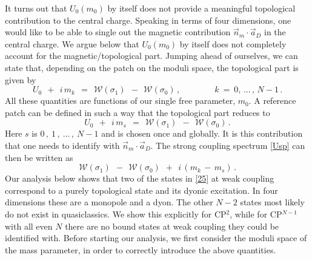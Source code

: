 \documentclass[epsfig,12pt]{article}
\def\beq{\begin{equation}}
\def\eeq{\end{equation}}
\def\beq{\begin{equation}}
\def\eeq{\end{equation}}
\newcommand{\mc}[1]{\mathcal{#1}}
\begin{document}
	It turns out that $ U_0(m_0) $ by itself does not  provide a meaningful topological contribution
	to the central charge.
	Speaking in terms of four dimensions, one would like to be able to single out 
	the magnetic contribution $ \vec{n}{}_m \cdot \vec{a}{}_D $ in the central charge.
	We argue below  that $ U_0(m_0) $ by itself does not completely account for the 
	magnetic/topological part.
	Jumping ahead of ourselves, we can state that, depending on the patch on the moduli space, 
	the topological part is given by
\beq
	U_0 ~~+~~ i\, m_k ~~=~~ \mc{W}(\sigma_1) ~~-~~ \mc{W}(\sigma_0) \,,
	\qquad\qquad k ~=~ 0,\,...\,,\, N-1\,.
\eeq
	All these quantities are functions of our single free parameter, $ m_0 $.
	A reference patch can be defined in such a way that the topological part reduces to
\beq
	U_0 ~~+~~ i\, m_s ~~=~~ \mc{W}(\sigma_1) ~~-~~ \mc{W}(\sigma_0) \,.
\eeq
	Here $ s $ is $ 0\,,~1\,,~...\,,~ N-1 $ and is chosen once and globally.
	It is this contribution that one needs to identify with $ \vec{n}{}_m \cdot \vec{a}{}_D $.
	The strong coupling spectrum \eqref{Usp} can then be written as
\beq
	\mc{W}(\sigma_1) ~~-~~ \mc{W}(\sigma_0) ~~+~~ i\, ( m_k \,-\, m_s )\,.
	\label{25}
\eeq
	Our analysis below shows that two of the states in \eqref{25} at weak coupling correspond to 
	a purely topological state and its dyonic excitation.
	In four dimensions these are a monopole and a dyon.
	The other $ N-2 $ states most likely do not exist in quasiclassics.
	We show this explicitly for CP$^2$, while for CP$^{N-1}$ with all even $ N $ 
	there are no bound states at weak coupling they could be identified with.
	Before starting our analysis, we first
	consider the moduli space of the mass parameter, 
	in order to correctly introduce the above quantities.

	
\end{document}
